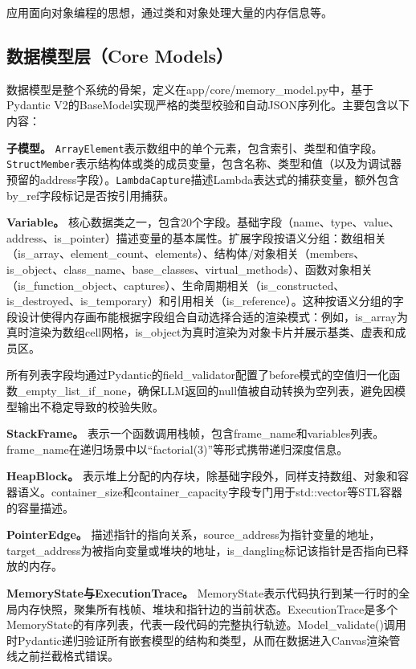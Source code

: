 \documentclass[12pt,a4paper]{ctexart}
\begin{document}
应用面向对象编程的思想，通过类和对象处理大量的内存信息等。

\subsection{数据模型层（Core Models）}

数据模型是整个系统的骨架，定义在app/core/memory\_model.py中，基于Pydantic V2的BaseModel实现严格的类型校验和自动JSON序列化。主要包含以下内容：

\textbf{子模型。} \texttt{ArrayElement}表示数组中的单个元素，包含索引、类型和值字段。\texttt{StructMember}表示结构体或类的成员变量，包含名称、类型和值（以及为调试器预留的address字段）。\texttt{LambdaCapture}描述Lambda表达式的捕获变量，额外包含by\_ref字段标记是否按引用捕获。

\textbf{Variable。} 核心数据类之一，包含20个字段。基础字段（name、type、value、address、is\_pointer）描述变量的基本属性。扩展字段按语义分组：数组相关（is\_array、element\_count、elements）、结构体/对象相关（members、is\_object、class\_name、base\_classes、virtual\_methods）、函数对象相关（is\_function\_object、captures）、生命周期相关（is\_constructed、is\_destroyed、is\_temporary）和引用相关（is\_reference）。这种按语义分组的字段设计使得内存画布能根据字段组合自动选择合适的渲染模式：例如，is\_array为真时渲染为数组cell网格，is\_object为真时渲染为对象卡片并展示基类、虚表和成员区。

所有列表字段均通过Pydantic的field\_validator配置了before模式的空值归一化函数\_empty\_list\_if\_none，确保LLM返回的null值被自动转换为空列表，避免因模型输出不稳定导致的校验失败。

\textbf{StackFrame。} 表示一个函数调用栈帧，包含frame\_name和variables列表。frame\_name在递归场景中以“factorial(3)”等形式携带递归深度信息。

\textbf{HeapBlock。} 表示堆上分配的内存块，除基础字段外，同样支持数组、对象和容器语义。container\_size和container\_capacity字段专门用于std::vector等STL容器的容量描述。

\textbf{PointerEdge。} 描述指针的指向关系，source\_address为指针变量的地址，target\_address为被指向变量或堆块的地址，is\_dangling标记该指针是否指向已释放的内存。

\textbf{MemoryState与ExecutionTrace。} MemoryState表示代码执行到某一行时的全局内存快照，聚集所有栈帧、堆块和指针边的当前状态。ExecutionTrace是多个MemoryState的有序列表，代表一段代码的完整执行轨迹。Model\_validate()调用时Pydantic递归验证所有嵌套模型的结构和类型，从而在数据进入Canvas渲染管线之前拦截格式错误。
\end{document}

